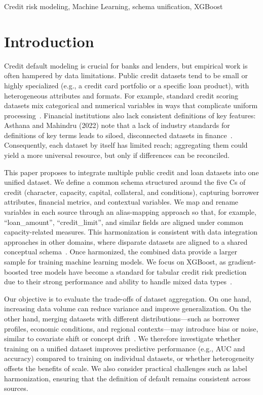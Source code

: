 \documentclass[onecolumn]{IEEEtai}
\begin{document}
\begin{IEEEkeywords}
Credit risk modeling, Machine Learning, schema unification, XGBoost
\end{IEEEkeywords}

\section{Introduction}

Credit default modeling is crucial for banks and lenders, but empirical work is often hampered by data limitations. Public credit datasets tend to be small or highly specialized (e.g., a credit card portfolio or a specific loan product), with heterogeneous attributes and formats. For example, standard credit scoring datasets mix categorical and numerical variables in ways that complicate uniform processing~\cite{6}. Financial institutions also lack consistent definitions of key features: Asthana and Mahindru (2022) note that a lack of industry standards for definitions of key terms leads to siloed, disconnected datasets in finance~\cite{9}. Consequently, each dataset by itself has limited reach; aggregating them could yield a more universal resource, but only if differences can be reconciled.

This paper proposes to integrate multiple public credit and loan datasets into one unified dataset. We define a common schema structured around the five Cs of credit (character, capacity, capital, collateral, and conditions), capturing borrower attributes, financial metrics, and contextual variables. We map and rename variables in each source through an alias-mapping approach so that, for example, ``loan\_amount'', ``credit\_limit'', and similar fields are aligned under common capacity-related measures. This harmonization is consistent with data integration approaches in other domains, where disparate datasets are aligned to a shared conceptual schema~\cite{8}. Once harmonized, the combined data provide a larger sample for training machine learning models. We focus on XGBoost, as gradient-boosted tree models have become a standard for tabular credit risk prediction due to their strong performance and ability to handle mixed data types~\cite{1,2,7,12,15}.

Our objective is to evaluate the trade-offs of dataset aggregation. On one hand, increasing data volume can reduce variance and improve generalization. On the other hand, merging datasets with different distributions—such as borrower profiles, economic conditions, and regional contexts—may introduce bias or noise, similar to covariate shift or concept drift~\cite{4,5,16,20}. We therefore investigate whether training on a unified dataset improves predictive performance (e.g., AUC and accuracy) compared to training on individual datasets, or whether heterogeneity offsets the benefits of scale. We also consider practical challenges such as label harmonization, ensuring that the definition of default remains consistent across sources.
\end{document}
